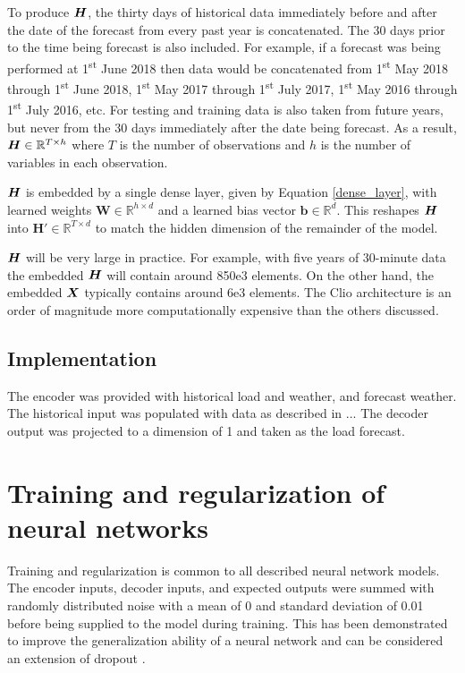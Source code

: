 To produce ${\bm{H}}$, the thirty days of historical data immediately before and after the date of the forecast from every past year is concatenated.
The 30 days prior to the time being forecast is also included.
For example, if a forecast was being performed at 1\textsuperscript{st} June 2018 then data would be concatenated from 1\textsuperscript{st} May 2018 through 1\textsuperscript{st} June 2018, 1\textsuperscript{st} May 2017 through 1\textsuperscript{st} July 2017, 1\textsuperscript{st} May 2016 through 1\textsuperscript{st} July 2016, etc.
For testing and training data is also taken from future years, but never from the 30 days immediately after the date being forecast.
As a result, ${\bm{H}} \in \mathbb{R}^{T \times h}$ where $T$ is the number of observations and $h$ is the number of variables in each observation.

${\bm{H}}$ is embedded by a single dense layer, given by Equation \ref{dense_layer}, with learned weights $\boldsymbol{W} \in \mathbb{R}^{h \times d}$ and a learned bias vector $\boldsymbol{b} \in \mathbb{R}^{d}$.
This reshapes ${\bm{H}}$ into $\boldsymbol{H'} \in \mathbb{R}^{T \times d}$ to match the hidden dimension of the remainder of the model.

${\bm{H}}$ will be very large in practice.
For example, with five years of 30-minute data the embedded ${\bm{H}}$ will contain around 850e3 elements.
On the other hand, the embedded ${\bm{X}}$ typically contains around 6e3 elements.
The Clio architecture is an order of magnitude more computationally expensive than the others discussed.

\subsection{Implementation}
The encoder was provided with historical load and weather, and forecast weather.
The historical input was populated with data as described in ...
The decoder output was projected to a dimension of 1 and taken as the load forecast.

\section{Training and regularization of neural networks}
\label{train-reg}
Training and regularization is common to all described neural network models.
The encoder inputs, decoder inputs, and expected outputs were summed with randomly distributed noise with a mean of 0 and standard deviation of 0.01 before being supplied to the model during training.
This has been demonstrated to improve the generalization ability of a neural network \cite{Wang1999} \cite{Brown2003} and can be considered an extension of dropout \cite{srivastava14a}.

